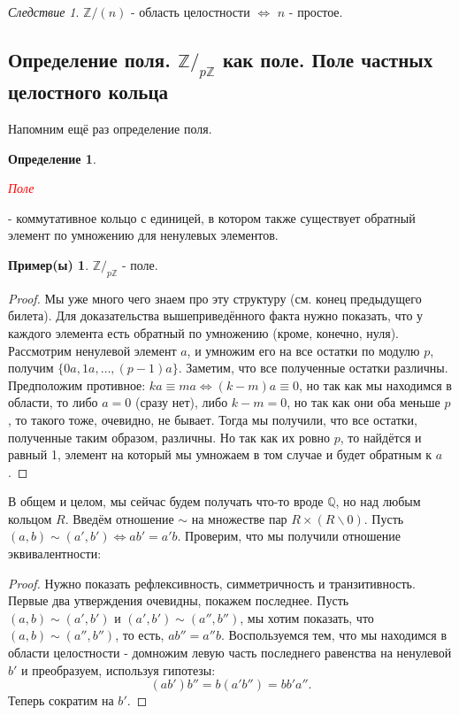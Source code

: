 \documentclass[a4paper,100pt]{article}
\theoremstyle{indented}
\theoremstyle{definition}
\newtheorem{defn}{Определение}
\newtheorem{exl}{Пример(ы)}
\theoremstyle{remark}
\newtheorem{cons}{Следствие}
\begin{document}
\begin{cons}
    $\mathbb{Z}/(n)$ - область целостности $\Longleftrightarrow$ $n$ - простое.
\end{cons}

\resetall

\subsection{Определение поля. $\mathbb{Z}/_{p\mathbb{Z}}$ как поле. Поле частных целостного кольца}

Напомним ещё раз определение поля.\

\begin{defn}
    \hypertarget{n16}{\textcolor{red}{\textit{Поле}}} - коммутативное кольцо с единицей, в котором также существует обратный элемент по умножению для ненулевых элементов.
\end{defn}

\begin{exl}
    $\mathbb{Z}/_{p\mathbb{Z}}$ - поле.
\end{exl}

\begin{proof}
    Мы уже много чего знаем про эту структуру (см. конец предыдущего билета). Для доказательства вышеприведённого факта нужно показать, что у каждого элемента есть обратный по умножению (кроме, конечно, нуля). Рассмотрим ненулевой элемент $a$, и умножим его на все остатки по модулю $p$, получим $\{0a, 1a, \dots, (p-1)a\}$. Заметим, что все полученные остатки различны. Предположим противное: $ka\equiv ma \Leftrightarrow (k-m)a\equiv 0$, но так как мы находимся в области, то либо $a=0$ (сразу нет), либо $k-m=0$, но так как они оба меньше $p$, то такого тоже, очевидно, не бывает. Тогда мы получили, что все остатки, полученные таким образом, различны. Но так как их ровно $p$, то найдётся и равный 1, элемент на который мы умножаем в том случае и будет обратным к $a$.
\end{proof}

В общем и целом, мы сейчас будем получать что-то вроде $\mathbb{Q}$, но над любым кольцом $R$. Введём отношение $\sim$ на множестве пар $R\times (R\backslash 0)$. Пусть $(a, b)\sim(a', b') \Leftrightarrow ab'=a'b$. Проверим, что мы получили отношение эквивалентности:

\begin{proof}
    Нужно показать рефлексивность, симметричность и транзитивность. Первые два утверждения очевидны, покажем последнее. Пусть $(a, b)\sim(a', b')$ и $(a', b')\sim(a'', b'')$, мы хотим показать, что $(a, b)\sim(a'', b'')$, то есть, $ab''=a''b$. Воспользуемся тем, что мы находимся в области целостности - домножим левую часть последнего равенства на ненулевой $b'$ и преобразуем, используя гипотезы:
    \[
        (ab')b''=b(a'b'')=bb'a''.
    \]
    Теперь сократим на $b'$.
\end{proof}
\end{document}
